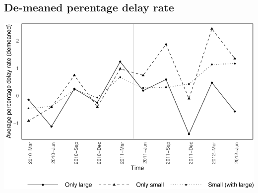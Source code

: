 \documentclass[
]{article}
\begin{document}
\hypertarget{de-meaned-perentage-delay-rate}{%
\subsection{De-meaned perentage delay
rate}\label{de-meaned-perentage-delay-rate}}

\includegraphics{parallel_trends_indirect_treat_files/figure-latex/demeaned_delay_plot_treat_groups-1.pdf}
\end{document}
